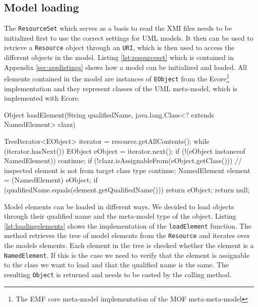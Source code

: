\documentclass{llncs}
\begin{document}
\subsection{Model loading}
The \texttt{Resource\-Set} which serves as a basis to read the XMI files needs to be 
initialized first to use the correct settings for UML models. It then can be used to retrieve a \texttt{Resource} object through 
an \texttt{URI}, which is then used to access the different objects in the model. Listing \ref{lst:resourceset} which is contained 
in Appendix \ref{sec:applistings} shows how a model can be initialized and loaded.
All elements contained in the model are instances of \texttt{EObject} from the Ecore\footnote{The EMF core meta-model implementation of
the MOF meta-meta-model} implementation and they represent classes of the UML meta-model, which is implemented with Ecore.

\begin{lstsingle}[language=Java,caption=Loading elements from the model,label=lst:loadingelements]
Object loadElement(String qualifiedName, 
  java.lang.Class<? extends NamedElement> clazz) {
  
  TreeIterator<EObject> iterator = 
    resource.getAllContents();
  while (iterator.hasNext()) {
    EObject eObject = iterator.next();
    if (!(eObject instanceof NamedElement)) {
      continue;
    }
    if (!clazz.isAssignableFrom(eObject.getClass())) {
      // inspected element is not from target class type
      continue;
    }
    NamedElement element = (NamedElement) eObject;
    if (qualifiedName.equals(element.getQualifiedName())) {
      return eObject;
    }
  }
  return null;
}
\end{lstsingle}

Model elements can be loaded in different ways. We decided to load objects through their qualified name and the meta-model type of the 
object. Listing \ref{lst:loadingelements} shows the implementation of the \texttt{loadElement} function. The method retrieves the tree of 
model elements from the \texttt{Resource} and iterates over the models elements. Each element in the tree is checked whether the element 
is a \texttt{NamedElement}. If this is the case we need to verify that the element is assignable to the class we want to 
load and that the qualified name is the same. The resulting \texttt{Object} is returned and needs to be casted by the 
calling method.
\end{document}
